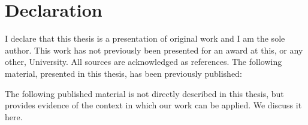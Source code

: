 \documentclass[a4paper,11pt]{report}
\begin{document}

\cleardoublepage
{}
{}
\chapter*{Declaration}

I declare that this thesis is a presentation of original work and I am
the sole author. 
This work has not previously been presented for an award at this, or
any other, University. 
All sources are acknowledged as references.
The following material, presented in this thesis, has been previously
published:

\begin{refsection}
  \raggedright
  \nocite{baxter2015a,baxter2017}
  \setlength{\bibitemsep}{0.5cm}
  \printbibliography[resetnumbers=true,heading=none]
\end{refsection}

The following published material is not directly described in this
thesis, but provides evidence of the context in which our work can be
applied. We discuss it here.

\begin{refsection}
  \raggedright
  \nocite{freitas2016}
  \setlength{\bibitemsep}{0.5cm}
  \printbibliography[resetnumbers=3,heading=none]
\end{refsection}
\end{document}
